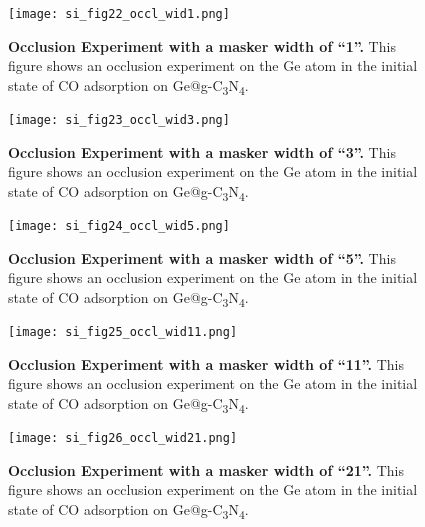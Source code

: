 \begin{figure}[htbp]
  \centering
  \texttt{[image: si\_fig22\_occl\_wid1.png]}
  \caption{\textbf{Occlusion Experiment with a masker width of “1”.}
  This figure shows an occlusion experiment on the Ge atom in
  the initial state of CO adsorption on Ge@g-C\textsubscript{3}N\textsubscript{4}.}
  \label{si_fig22:occl_wid1}
\end{figure}

\begin{figure}[htbp]
  \centering
  \texttt{[image: si\_fig23\_occl\_wid3.png]}
  \caption{\textbf{Occlusion Experiment with a masker width of “3”.}
  This figure shows an occlusion experiment on the Ge atom in
  the initial state of CO adsorption on Ge@g-C\textsubscript{3}N\textsubscript{4}.}
  \label{si_fig23:occl_wid3}
\end{figure}

\begin{figure}[htbp]
  \centering
  \texttt{[image: si\_fig24\_occl\_wid5.png]}
  \caption{\textbf{Occlusion Experiment with a masker width of “5”.}
  This figure shows an occlusion experiment on the Ge atom in
  the initial state of CO adsorption on Ge@g-C\textsubscript{3}N\textsubscript{4}.}
  \label{si_fig24:occl_wid5}
\end{figure}

\begin{figure}[htbp]
  \centering
  \texttt{[image: si\_fig25\_occl\_wid11.png]}
  \caption{\textbf{Occlusion Experiment with a masker width of “11”.}
  This figure shows an occlusion experiment on the Ge atom in
  the initial state of CO adsorption on Ge@g-C\textsubscript{3}N\textsubscript{4}.}
  \label{si_fig25:occl_wid11}
\end{figure}

\begin{figure}[htbp]
  \centering
  \texttt{[image: si\_fig26\_occl\_wid21.png]}
  \caption{\textbf{Occlusion Experiment with a masker width of “21”.}
  This figure shows an occlusion experiment on the Ge atom in
  the initial state of CO adsorption on Ge@g-C\textsubscript{3}N\textsubscript{4}.}
  \label{si_fig26:occl_wid21}
\end{figure}

